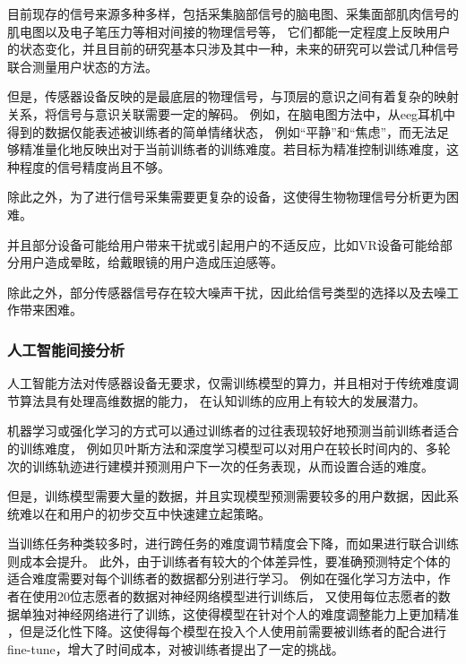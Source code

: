 \documentclass{article}
\begin{document}
            目前现存的信号来源多种多样，包括采集脑部信号的脑电图、采集面部肌肉信号的肌电图以及电子笔压力等相对间接的物理信号等，
            它们都能一定程度上反映用户的状态变化，并且目前的研究基本只涉及其中一种，未来的研究可以尝试几种信号联合测量用户状态的方法。

            但是，传感器设备反映的是最底层的物理信号，与顶层的意识之间有着复杂的映射关系，将信号与意识关联需要一定的解码。
            例如，在脑电图方法中，从eeg耳机中得到的数据仅能表述被训练者的简单情绪状态，
            例如“平静”和“焦虑”，而无法足够精准量化地反映出对于当前训练者的训练难度。若目标为精准控制训练难度，这种程度的信号精度尚且不够。

            除此之外，为了进行信号采集需要更复杂的设备，这使得生物物理信号分析更为困难。

            并且部分设备可能给用户带来干扰或引起用户的不适反应，比如VR设备可能给部分用户造成晕眩，给戴眼镜的用户造成压迫感等。

            除此之外，部分传感器信号存在较大噪声干扰，因此给信号类型的选择以及去噪工作带来困难。
            
            \subsubsection{人工智能间接分析}
            人工智能方法对传感器设备无要求，仅需训练模型的算力，并且相对于传统难度调节算法具有处理高维数据的能力，
            在认知训练的应用上有较大的发展潜力。

            机器学习或强化学习的方式可以通过训练者的过往表现较好地预测当前训练者适合的训练难度，
            例如贝叶斯方法和深度学习模型可以对用户在较长时间内的、多轮次的训练轨迹进行建模并预测用户下一次的任务表现，从而设置合适的难度。

            但是，训练模型需要大量的数据，并且实现模型预测需要较多的用户数据，因此系统难以在和用户的初步交互中快速建立起策略。
            
            当训练任务种类较多时，进行跨任务的难度调节精度会下降，而如果进行联合训练则成本会提升。
            此外，由于训练者有较大的个体差异性，要准确预测特定个体的适合难度需要对每个训练者的数据都分别进行学习。
            例如在强化学习方法中，作者在使用20位志愿者的数据对神经网络模型进行训练后，
            又使用每位志愿者的数据单独对神经网络进行了训练，这使得模型在针对个人的难度调整能力上更加精准
            ，但是泛化性下降。这使得每个模型在投入个人使用前需要被训练者的配合进行fine-tune，增大了时间成本，对被训练者提出了一定的挑战。
            
\end{document}
